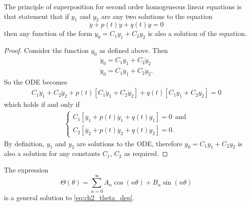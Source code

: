 \begin{thm}The principle of superposition for second order homogeneous linear equations is that statement that if $y_1$ and $y_2$ are any two solutions to the equation
  \[ \ddot{y} + p(t)\dot{y} + q(t)y =  0\]
  then any function of the form
  $ y_0 = C_1 y_1 + C_2 y_2 $
  is also a solution of the equation.
\end{thm}
\begin{proof}
  Consider the function $y_0$ as defined above. Then
  \begin{gather*}
    \dot{y}_0 = C_1 \dot{y}_1 + C_2 \dot{y}_2 \\
    \ddot{y}_0 = C_1 \ddot{y}_1 + C_2 \ddot{y}_2.
  \end{gather*}
  So the ODE becomes
  \begin{gather*}
    C_1 \ddot{y}_1 + C_2 \ddot{y}_2 + p(t) [ C_1 \dot{y}_1 + C_2 \dot{y}_2 ] + q(t) [C_1 y_1 + C_2 y_2] = 0
  \end{gather*}
  which holds if and only if
  \begin{gather*}
    \left\{
    \begin{array}{l}
      C_1[\ddot{y_1} + p(t)\dot{y_1} + q(t)y_1] =  0 ~~\text{and}\\
      C_2[\ddot{y_2} + p(t)\dot{y_2} + q(t)y_2] =  0.
    \end{array}
    \right.
  \end{gather*}
  By definition, $y_1$ and $y_2$ are solutions to the ODE, therefore $ y_0 = C_1 y_1 + C_2 y_2 $ is also a solution for any constants $C_1$, $C_2$ as required.
\end{proof}
\begin{propn}
  The expression
  \[
  \Theta(\theta) = \sum_{n=0}^{\infty} A_n \cos(n\theta) + B_n \sin(n\theta)
  \]
  is a general solution to \eqref{eq:ch2_theta_dep}.
\end{propn}
